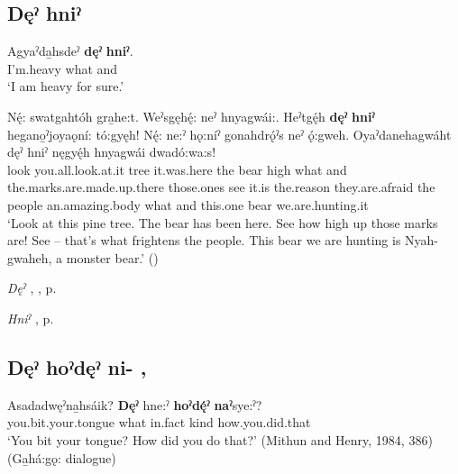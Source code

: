 \subsection*{\textbf{Dęˀ hniˀ} } \label{p:[dęˀ hniˀ]}

\ea
\label{ex:dpart12}
\gll Agyaˀda̱hsdeˀ \textbf{dęˀ} \textbf{hniˀ}. \\
I’m.heavy what and\\
\glt ‘I am heavy for sure.’
\z

\ea
\label{ex:dpart13}
\gll Nę́: swatgahtóh gra̱he:t. Weˀsgęhę́: neˀ hnyagwái:. Heˀtgę́h \textbf{dęˀ} \textbf{hniˀ} hegano̱ˀjoyaǫní: tó:gyęh! Nę́: ne:ˀ hǫ:níˀ gonahdrǫ́ˀs neˀ ǫ́:gweh. Oyaˀdanehagwáht dęˀ hniˀ nęgyę́h hnyagwái dwadó:wa:s! \\
look you.all.look.at.it tree it.was.here the bear high what and the.marks.are.made.up.there those.ones see it.is the.reason they.are.afraid the people an.amazing.body what and this.one bear we.are.hunting.it \\
\glt ‘Look at this pine tree. The bear has been here. See how high up those marks are! See – that’s what frightens the people. This bear we are hunting is Nyah-gwaheh, a monster bear.’ (\cite{carrier_legends_2013})
\z

\begin{CayugaRelated}
\item \textit{Dęˀ} , , p. \pageref{p:[dęˀ-]}\\
\item \textit{Hniˀ} , p. \pageref{p:[hniˀ] ‘and’}
\end{CayugaRelated}

\subsection*{\textbf{Dęˀ hoˀdęˀ ni-} , } \label{p:[dęˀ hoˀdęˀ ni-]}

\ea
\label{ex:dpart14}
\gll Asadadwęˀna̱hsáik? \textbf{Dęˀ} hne:ˀ \textbf{hoˀdę́ˀ} \textbf{naˀ}sye:ˀ? \\
you.bit.your.tongue what in.fact kind how.you.did.that \\
\glt ‘You bit your tongue? How did you do that?’ (Mithun and Henry, 1984, 386) (Ga̱há:gǫ: dialogue)
\z

